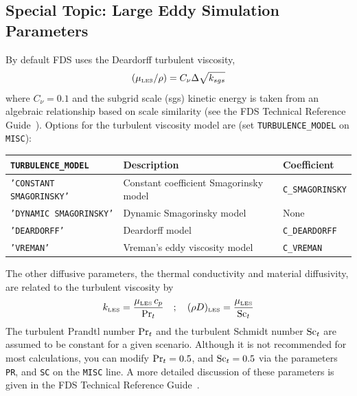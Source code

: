 \documentclass[11pt]{book}
\newcommand{\ct}{\tt\small}
\newcommand{\be}{\begin{equation}}
\newcommand{\ee}{\end{equation}}
\newcommand{\PR}{\hbox{Pr}}
\newcommand{\SC}{\hbox{Sc}}
\begin{document}
\subsection{Special Topic: Large Eddy Simulation Parameters}
\label{info:LES}

By default FDS uses the Deardorff \cite{Deardorff:1980,Pope:2000} turbulent viscosity,
\begin{equation}
(\mu_{\hbox{\tiny LES}}/\rho) = C_\nu \Delta \sqrt{k_{sgs}}
\end{equation}
where $C_\nu=0.1$ and the subgrid scale (sgs) kinetic energy is taken from an algebraic relationship based on scale similarity (see the FDS Technical Reference Guide~\cite{FDS_Math_Guide}).
Options for the turbulent viscosity model are (set {\ct TURBULENCE\_MODEL} on {\ct MISC}):
\begin{center}
\begin{tabular}{|lll|}
\hline
{\ct TURBULENCE\_MODEL}         & Description                                                   & Coefficient           \\ \hline
{\ct 'CONSTANT SMAGORINSKY'}    & Constant coefficient Smagorinsky model \cite{Smagorinsky:1}   & {\ct C\_SMAGORINSKY}  \\
{\ct 'DYNAMIC SMAGORINSKY'}     & Dynamic Smagorinsky model \cite{Germano:1991,Moin:1991}       & None                  \\
{\ct 'DEARDORFF'}               & Deardorff model \cite{Deardorff:1980,Pope:2000}               & {\ct C\_DEARDORFF}    \\
{\ct 'VREMAN'}                  & Vreman's eddy viscosity model \cite{Vreman:2004}              & {\ct C\_VREMAN}       \\ \hline
\end{tabular}
\end{center}
The other diffusive parameters, the thermal conductivity and material diffusivity, are related to the turbulent viscosity by
\be k_{\hbox{\tiny LES}} = \frac{\mu_{\hbox{\tiny LES}} \, c_p}{\PR_t}
\quad ; \quad
 (\rho D)_{\hbox{\tiny LES}} =\frac{\mu_{\hbox{\tiny LES}}}{\SC_t} \ee
The turbulent Prandtl number $\PR_t$ and the turbulent Schmidt number $\SC_t$ are assumed to be constant for a given scenario. Although it is not recommended for most calculations, you can modify $\PR_t=0.5$, and $\SC_t=0.5$ via the parameters {\ct PR}, and {\ct SC} on the {\ct MISC} line. A more detailed discussion of these parameters is given in the FDS Technical Reference Guide~\cite{FDS_Math_Guide}.
\end{document}
